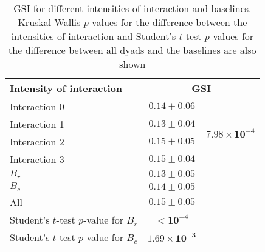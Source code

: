 \begin{table}
\caption{GSI for different intensities of interaction and baselines. Kruskal-Wallis $p$-values for the difference between the intensities of interaction and Student's $t$-test $p$-values for the difference between all dyads and the baselines are also shown\label{tab:coherence_interaction}}
\begin{tabular}{lcc}
\toprule
Intensity of interaction & \multicolumn{2}{c}{GSI}  \\
\midrule
Interaction 0 & $0.14 \pm 0.06$ & \multirow{4}{*}{$\mathbf{7.98 \times 10^{-4}}$} \\
Interaction 1 & $0.13 \pm 0.04$ & \\
Interaction 2 & $0.15 \pm 0.05$ & \\
Interaction 3 & $0.15 \pm 0.04$ & \\
\midrule
$B_r$ & $0.13 \pm 0.05$ & \\
$B_c$ & $0.14 \pm 0.05$ & \\
\midrule
All & $0.15 \pm 0.05$ & \\
\midrule
Student's $t$-test $p$-value for $B_r$ & $\mathbf{< 10^{-4}}$ &\\
Student's $t$-test $p$-value for $B_c$ & $\mathbf{1.69 \times 10^{-3}}$  &\\
\bottomrule
\end{tabular}
\end{table}
